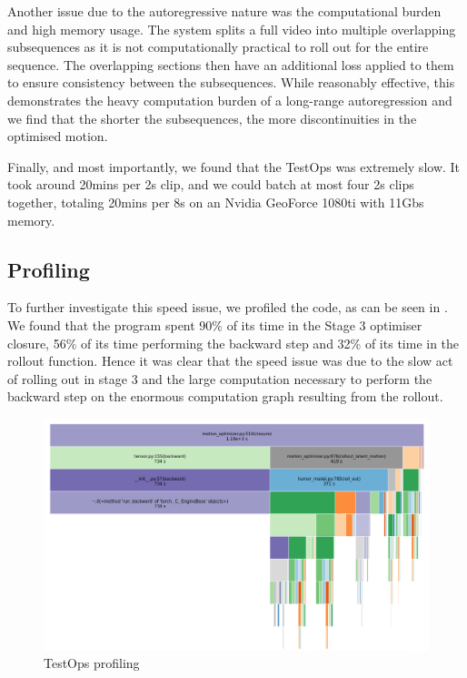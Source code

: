 Another issue due to the autoregressive nature was the computational burden and high memory usage. The system splits a full video into multiple overlapping subsequences as it is not computationally practical to roll out for the entire sequence. The overlapping sections then have an additional loss applied to them to ensure consistency between the subsequences. While reasonably effective, this demonstrates the heavy computation burden of a long-range autoregression and we find that the shorter the subsequences, the more discontinuities in the optimised motion.

Finally, and most importantly, we found that the TestOps was extremely slow. It took around 20mins per 2s clip, and we could batch at most four 2s clips together, totaling 20mins per 8s on an Nvidia GeoForce 1080ti with 11Gbs memory.

\subsection{Profiling}
To further investigate this speed issue, we profiled the code, as can be seen in . We found that the program spent 90\% of its time in the Stage 3 optimiser closure, 56\% of its time performing the backward step and 32\% of its time in the rollout function. Hence it was clear that the speed issue was due to the slow act of rolling out in stage 3 and the large computation necessary to perform the backward step on the enormous computation graph resulting from the rollout.

\begin{figure}[!ht]
    \centering
    \includegraphics[width=1\textwidth]{Figures/humor/profiling/profiling.png}
    \caption{TestOps profiling}
    \label{fig:humor_profiling}
\end{figure}

